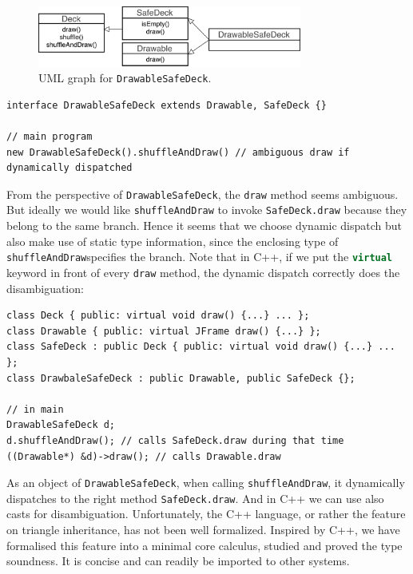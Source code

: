 \begin{figure}[t]
	\saveSpaceFig
	\centering
	\includegraphics[height=2cm]{pics/DrawableSafeDeck.pdf}
	\caption{UML graph for \lstinline|DrawableSafeDeck|.}\label{fig:drawablesafedeck}
	\saveSpaceFig
\end{figure}

\vspace{3pt}\begin{lstlisting}
interface DrawableSafeDeck extends Drawable, SafeDeck {}

// main program
new DrawableSafeDeck().shuffleAndDraw() // ambiguous draw if dynamically dispatched
\end{lstlisting}\vspace{3pt}
From the perspective of \lstinline|DrawableSafeDeck|, the \lstinline|draw| method seems ambiguous. But ideally we would
like \lstinline|shuffleAndDraw| to invoke \lstinline|SafeDeck.draw| because they belong to the same branch. Hence it
seems that we choose dynamic dispatch but also make use of static type information, since the enclosing type of \lstinline|shuffleAndDraw|specifies the branch. Note that in C++, if we put the \lstinline[language=c++]|virtual| keyword in front of every \lstinline|draw| method, the dynamic dispatch correctly does the disambiguation:
\vspace{3pt}\begin{lstlisting}
class Deck { public: virtual void draw() {...} ... };
class Drawable { public: virtual JFrame draw() {...} };
class SafeDeck : public Deck { public: virtual void draw() {...} ... };
class DrawbaleSafeDeck : public Drawable, public SafeDeck {};

// in main
DrawableSafeDeck d;
d.shuffleAndDraw(); // calls SafeDeck.draw during that time
((Drawable*) &d)->draw(); // calls Drawable.draw
\end{lstlisting}\vspace{3pt}
As an object of \lstinline|DrawableSafeDeck|, when calling \lstinline|shuffleAndDraw|, it dynamically dispatches to the right method \lstinline|SafeDeck.draw|. And in C++ we can use also casts for disambiguation.
Unfortunately, the C++ language, or rather the feature on triangle inheritance, has not been well formalized. Inspired by C++, we
have formalised this feature into a minimal core calculus, studied and proved the type soundness. It is concise and can readily be imported to other systems.\\

